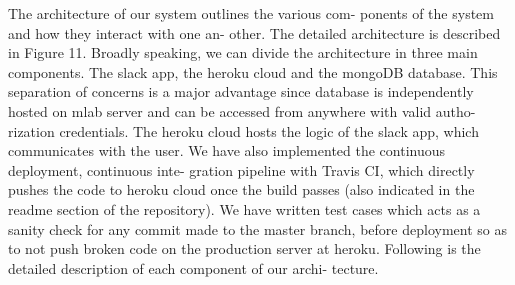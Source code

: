 The architecture of our system outlines the various com- ponents of the system and how they interact with one an- other. The detailed architecture is described in Figure 11.
Broadly speaking, we can divide the architecture in three main components. The slack app, the heroku cloud and the mongoDB database. This separation of concerns is a major advantage since database is independently hosted on mlab server and can be accessed from anywhere with valid autho- rization credentials. The heroku cloud hosts the logic of the slack app, which communicates with the user. We have also implemented the continuous deployment, continuous inte- gration pipeline with Travis CI, which directly pushes the code to heroku cloud once the build passes (also indicated in the readme section of the repository). We have written test cases which acts as a sanity check for any commit made to the master branch, before deployment so as to not push broken code on the production server at heroku. Following is the detailed description of each component of our archi- tecture.
